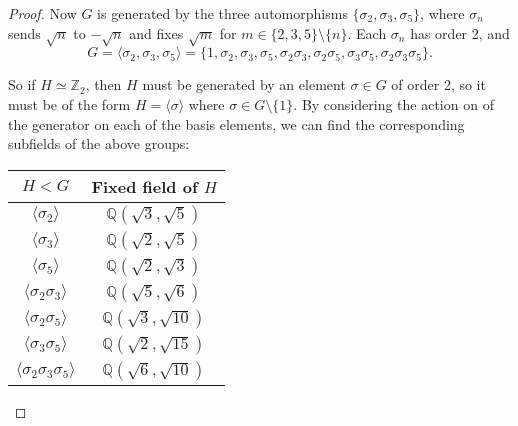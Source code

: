 \documentclass{article}
\begin{document}
\begin{proof}
    Now $G$ is generated by the three automorphisms
    $\{\sigma_2,\sigma_3,\sigma_5\}$, where $\sigma_n$ sends $\sqrt{n}$ to
    $-\sqrt{n}$ and fixes $\sqrt{m}$ for $m\in\{2,3,5\}\setminus\{n\}$.
    Each $\sigma_n$ has order 2, and
    \[G =\langle\sigma_2,\sigma_3,\sigma_5\rangle
    =\{1,\sigma_2,\sigma_3,\sigma_5, \sigma_2\sigma_3, \sigma_2\sigma_5,
    \sigma_3\sigma_5, \sigma_2\sigma_3\sigma_5\}.\]

    So if $H\simeq\mathbb{Z}_2$, then $H$ must be generated by an
    element $\sigma\in G$ of order 2, so it must be of the form
    $H=\langle\sigma\rangle$ where $\sigma\in G\setminus\{1\}$. By
    considering the action on of the generator on each of the basis
    elements, we can find the corresponding subfields of the above groups:
    \begin{table}[h]
      \centering
      \begin{tabular}{c|c}
        $H<G$ & Fixed field of $H$ \\
        \hline
        $\langle \sigma_2\rangle$ &$\mathbb{Q}(\sqrt{3},\sqrt{5})$\\
        $\langle \sigma_3\rangle$ &$\mathbb{Q}(\sqrt{2},\sqrt{5})$\\
        $\langle \sigma_5\rangle$ &$\mathbb{Q}(\sqrt{2},\sqrt{3})$\\
        $\langle \sigma_2\sigma_3\rangle$ &$\mathbb{Q}(\sqrt{5},\sqrt{6})$\\
        $\langle \sigma_2\sigma_5\rangle$ &$\mathbb{Q}(\sqrt{3},\sqrt{10})$\\
        $\langle \sigma_3\sigma_5\rangle$ &$\mathbb{Q}(\sqrt{2},\sqrt{15})$\\
        $\langle \sigma_2\sigma_3\sigma_5\rangle$
          &$\mathbb{Q}(\sqrt{6},\sqrt{10})$ \\
      \end{tabular}
    \end{table}


\end{proof}
\end{document}
